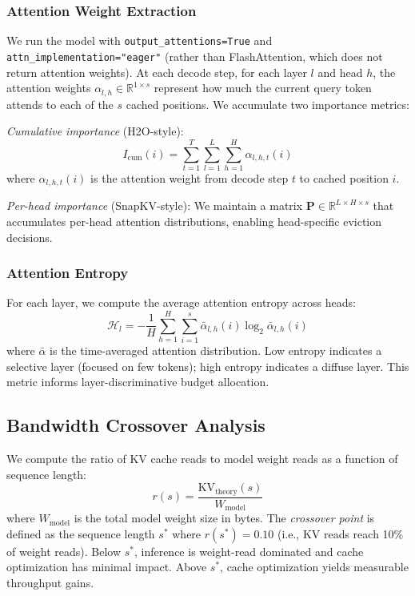 \documentclass[conference]{IEEEtran}
\begin{document}
\subsubsection{Attention Weight Extraction}
We run the model with \texttt{output\_attentions=True} and \texttt{attn\_implementation="eager"} (rather than FlashAttention, which does not return attention weights). At each decode step, for each layer $l$ and head $h$, the attention weights $\alpha_{l,h} \in \mathbb{R}^{1 \times s}$ represent how much the current query token attends to each of the $s$ cached positions. We accumulate two importance metrics:

\textit{Cumulative importance} (H2O-style):
\begin{equation}
I_{\text{cum}}(i) = \sum_{t=1}^{T} \sum_{l=1}^{L} \sum_{h=1}^{H} \alpha_{l,h,t}(i)
\end{equation}
where $\alpha_{l,h,t}(i)$ is the attention weight from decode step $t$ to cached position $i$.

\textit{Per-head importance} (SnapKV-style): We maintain a matrix $\mathbf{P} \in \mathbb{R}^{L \times H \times s}$ that accumulates per-head attention distributions, enabling head-specific eviction decisions.

\subsubsection{Attention Entropy}
For each layer, we compute the average attention entropy across heads:
\begin{equation}
\mathcal{H}_l = -\frac{1}{H} \sum_{h=1}^{H} \sum_{i=1}^{s} \bar{\alpha}_{l,h}(i) \log_2 \bar{\alpha}_{l,h}(i)
\end{equation}
where $\bar{\alpha}$ is the time-averaged attention distribution. Low entropy indicates a selective layer (focused on few tokens); high entropy indicates a diffuse layer. This metric informs layer-discriminative budget allocation.

\subsection{Bandwidth Crossover Analysis}

We compute the ratio of KV cache reads to model weight reads as a function of sequence length:
\begin{equation}
r(s) = \frac{\text{KV}_{\text{theory}}(s)}{W_{\text{model}}}
\end{equation}
where $W_{\text{model}}$ is the total model weight size in bytes. The \textit{crossover point} is defined as the sequence length $s^*$ where $r(s^*) = 0.10$ (i.e., KV reads reach 10\% of weight reads). Below $s^*$, inference is weight-read dominated and cache optimization has minimal impact. Above $s^*$, cache optimization yields measurable throughput gains.
\end{document}
